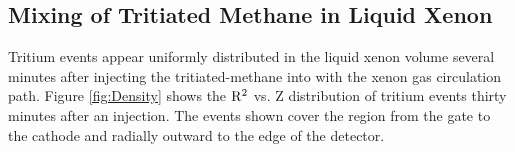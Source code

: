 \subsection{Mixing of Tritiated Methane in Liquid Xenon}

Tritium events appear uniformly distributed in the liquid xenon volume several minutes after injecting the tritiated-methane into with the xenon gas circulation path. Figure \ref{fig:Density} shows the $\rm R^2$ vs. Z distribution of tritium events thirty minutes after an injection. The events shown cover the region from the gate to the cathode and radially outward to the edge of the detector. %
 
